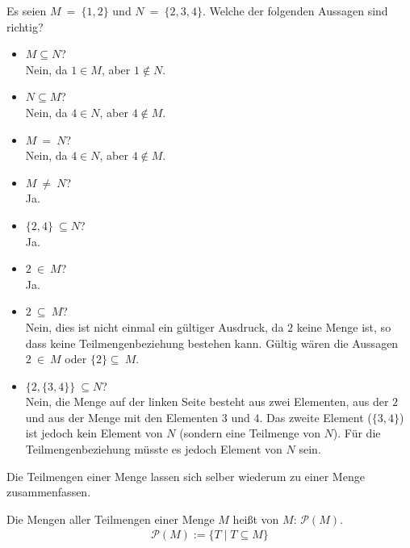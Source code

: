 \begin{Unit}[Uebung]
Es seien $M\ =\ \{1, 2\}$ und $N\ =\ \{2, 3, 4\}$. Welche der folgenden 
Aussagen sind richtig?
\begin{itemize}
  \item $M \subseteq N$? \\
    Nein, da $1 \in M$, aber $1 \notin N$.
  \item $N \subseteq M$? \\
    Nein, da $4 \in N$, aber $4 \notin M$.
  \item $M\ =\ N$? \\
    Nein, da $4 \in N$, aber $4 \notin M$.
  \item $M\ \not=\ N$? \\
    Ja.
  \item $\{2, 4\}\ \subseteq N$? \\
    Ja.
  \item $2\ \in\ M$? \\
    Ja.
  \item $2\ \subseteq\ M$? \\
    Nein, dies ist nicht einmal ein gültiger Ausdruck, da $2$ keine Menge 
    ist, so dass keine Teilmengenbeziehung bestehen kann. Gültig wären die 
    Aussagen  $2\ \in\ M$ oder $\{2\} \subseteq\ M$.
  \item $\{2, \{3, 4\}\}\ \subseteq N$? \\
    Nein, die Menge auf der linken Seite besteht aus zwei Elementen, aus der 
    $2$ und aus der Menge mit den Elementen $3$ und $4$. Das zweite Element 
    ($\{3,4\}$) ist jedoch kein Element von $N$ (sondern eine Teilmenge von 
    $N$). Für die Teilmengenbeziehung müsste es jedoch Element von $N$ sein.
\end{itemize}
\end{Unit}


\begin{Unit}
Die Teilmengen einer Menge lassen sich selber wiederum zu einer Menge
zusammenfassen.

\begin{Definition}
Die Mengen aller Teilmengen einer Menge $M$ heißt  von 
$M$: $\mathcal{P}(M)$.
\begin{align}
  \mathcal{P}(M) := \{T \mid T \subseteq M\}
\end{align}
\end{Definition}
\end{Unit}

